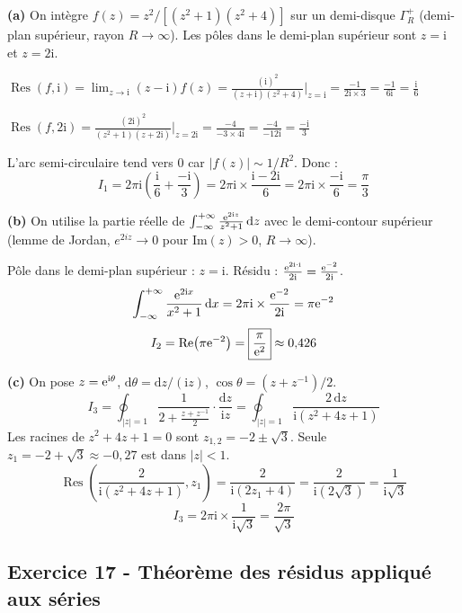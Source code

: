 \documentclass[12pt,a4paper]{article}
\begin{document}
\begin{boitecorrige}
\textbf{(a)} On intègre $f(z)=z^2/[(z^2+1)(z^2+4)]$ sur un demi-disque $\Gamma_R^+$ (demi-plan supérieur, rayon $R\to\infty$). Les pôles dans le demi-plan supérieur sont $z=\mathrm{i}$ et $z=2\mathrm{i}$.

$\operatorname{Res}(f,\mathrm{i}) = \lim_{z\to\mathrm{i}}(z-\mathrm{i})f(z) = \frac{(\mathrm{i})^2}{(z+\mathrm{i})(z^2+4)}\big|_{z=\mathrm{i}} = \frac{-1}{2\mathrm{i}\times3} = \frac{-1}{6\mathrm{i}} = \frac{\mathrm{i}}{6}$

$\operatorname{Res}(f,2\mathrm{i}) = \frac{(2\mathrm{i})^2}{(z^2+1)(z+2\mathrm{i})}\big|_{z=2\mathrm{i}} = \frac{-4}{-3\times4\mathrm{i}} = \frac{-4}{-12\mathrm{i}} = \frac{-\mathrm{i}}{3}$

L'arc semi-circulaire tend vers 0 car $|f(z)|\sim 1/R^2$. Donc :
\[
I_1 = 2\pi\mathrm{i}\left(\frac{\mathrm{i}}{6} + \frac{-\mathrm{i}}{3}\right) = 2\pi\mathrm{i}\times\frac{\mathrm{i}-2\mathrm{i}}{6} = 2\pi\mathrm{i}\times\frac{-\mathrm{i}}{6} = \boxed{\frac{\pi}{3}}
\]

\textbf{(b)} On utilise la partie réelle de $\int_{-\infty}^{+\infty}\frac{\mathrm{e}^{2\mathrm{i}z}}{z^2+1}\,\mathrm{d}z$ avec le demi-contour supérieur (lemme de Jordan, $e^{2iz}\to0$ pour $\text{Im}(z)>0$, $R\to\infty$).

Pôle dans le demi-plan supérieur : $z=\mathrm{i}$. Résidu : $\frac{\mathrm{e}^{2\mathrm{i}\cdot\mathrm{i}}}{2\mathrm{i}} = \frac{\mathrm{e}^{-2}}{2\mathrm{i}}$.
\[
\int_{-\infty}^{+\infty}\frac{\mathrm{e}^{2\mathrm{i}x}}{x^2+1}\,\mathrm{d}x = 2\pi\mathrm{i}\times\frac{\mathrm{e}^{-2}}{2\mathrm{i}} = \pi\mathrm{e}^{-2}
\]
\[
I_2 = \operatorname{Re}\!\left(\pi\mathrm{e}^{-2}\right) = \boxed{\frac{\pi}{\mathrm{e}^{2}}} \approx 0{,}426
\]

\textbf{(c)} On pose $z=\mathrm{e}^{\mathrm{i}\theta}$, $\mathrm{d}\theta=\mathrm{d}z/(\mathrm{i}z)$, $\cos\theta=(z+z^{-1})/2$.
\[
I_3 = \oint_{|z|=1}\frac{1}{2+\frac{z+z^{-1}}{2}}\cdot\frac{\mathrm{d}z}{\mathrm{i}z} = \oint_{|z|=1}\frac{2\,\mathrm{d}z}{\mathrm{i}(z^2+4z+1)}
\]
Les racines de $z^2+4z+1=0$ sont $z_{1,2}=-2\pm\sqrt{3}$. Seule $z_1=-2+\sqrt{3}\approx-0{,}27$ est dans $|z|<1$.
\[
\operatorname{Res}\!\left(\frac{2}{\mathrm{i}(z^2+4z+1)},z_1\right) = \frac{2}{\mathrm{i}(2z_1+4)} = \frac{2}{\mathrm{i}(2\sqrt{3})} = \frac{1}{\mathrm{i}\sqrt{3}}
\]
\[
I_3 = 2\pi\mathrm{i}\times\frac{1}{\mathrm{i}\sqrt{3}} = \boxed{\frac{2\pi}{\sqrt{3}}}
\]
\end{boitecorrige}

\subsection*{Exercice 17 - Théorème des résidus appliqué aux séries \niveau{\difficile}}
\end{document}
